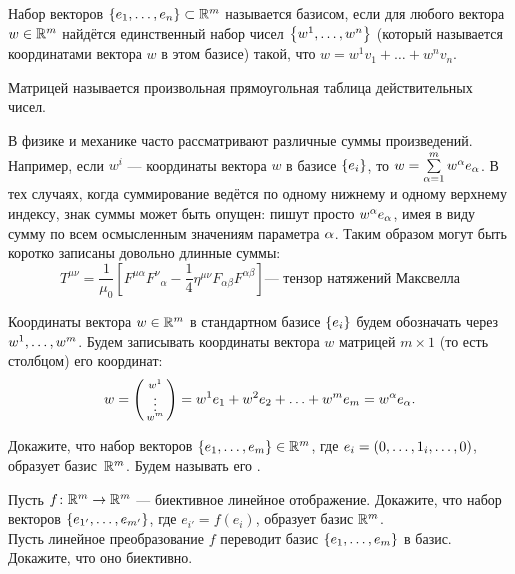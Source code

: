\documentclass[a4paper,12pt]{article}
\begin{document}

Набор векторов $\left\{e_1,\ldots, e_n\right\}\subset\mathbb{R}^m$ называется базисом, если для любого вектора $w\in\mathbb{R}^m$ найдётся единственный набор чисел $\left\{w^1,\ldots, w^n\right\}$ (который называется координатами вектора $w$ в этом базисе) такой, что
$w = w^1 v_1 + \ldots + w^n v_n$.

     Матрицей называется произвольная прямоугольная таблица действительных чисел.

В физике и механике часто рассматривают различные суммы произведений.
Например, если $w^i$ --- координаты вектора $w$ в базисе $\left\{e_i\right\}$, то $w = \sum\limits_{\alpha=1}^{m}w^\alpha e_\alpha$.
В тех случаях, когда суммирование ведётся по одному нижнему и одному верхнему индексу, знак суммы может быть опущен:
пишут просто $w^\alpha e_\alpha$, имея в виду сумму по всем осмысленным значениям параметра $\alpha$.
Таким образом могут быть коротко записаны довольно длинные суммы:
$$
T^{\mu\nu} = \frac{1}{\mu_0} \left[ F^{\mu \alpha}F^\nu{}_{\alpha} - \frac{1}{4} \eta^{\mu\nu}F_{\alpha\beta} F^{\alpha\beta}\right] \text{--- тензор натяжений Максвелла}$$

\noindent
Координаты вектора $w\in\mathbb{R}^m$ в стандартном базисе $\left\{e_i\right\}$ будем обозначать через $w^1,\ldots, w^m$.
Будем записывать координаты вектора $w$ матрицей $m\times 1$ (то есть столбцом) его координат:
    $$ w = \left(\begin{smallmatrix}w^1\\\vdots\\w^m\end{smallmatrix}\right) = w^1 e_1 + w^2 e_2 + \ldots +  w^m e_m = w^\alpha e_\alpha.$$
\vspace*{-3mm}



    Докажите, что набор векторов $\left\{e_1,\ldots, e_m\right\}\in\mathbb{R}^m$, где $e_i=(0,\ldots,1_i,\ldots,0)$, образует базис~$\mathbb{R}^m$.
    Будем называть его .

    Пусть $f\colon\mathbb{R}^m\rightarrow\mathbb{R}^m$ --- биективное линейное отображение. Докажите, что набор векторов $\left\{e_{1'},\ldots, e_{m'}\right\}$, где $e_{i'}=f(e_i)$, образует базис $\mathbb{R}^m$.\\
    Пусть линейное преобразование $f$ переводит базис $\left\{e_1,\ldots, e_m\right\}$ в базис. Докажите, что оно биективно.
\end{document}
